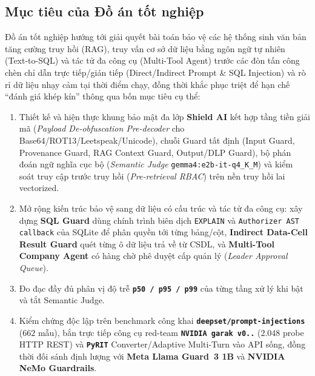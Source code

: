 \documentclass[a4paper,12pt]{article}
\begin{document}
\subsection{Mục tiêu của Đồ án tốt nghiệp}
Đồ án tốt nghiệp hướng tới giải quyết bài toán bảo vệ các hệ thống sinh văn bản tăng cường truy hồi (RAG), truy vấn cơ sở dữ liệu bằng ngôn ngữ tự nhiên (Text-to-SQL) và tác tử đa công cụ (Multi-Tool Agent) trước các đòn tấn công chèn chỉ dẫn trực tiếp/gián tiếp (Direct/Indirect Prompt \& SQL Injection) và rò rỉ dữ liệu nhạy cảm tại thời điểm chạy, đồng thời khắc phục triệt để hạn chế ``đánh giá khép kín'' thông qua bốn mục tiêu cụ thể:
\begin{enumerate}
    \item Thiết kế và hiện thực khung bảo mật đa lớp \textbf{Shield AI} kết hợp tầng tiền giải mã (\emph{Payload De-obfuscation Pre-decoder} cho Base64/ROT13/Leetspeak/Unicode), chuỗi Guard tất định (Input Guard, Provenance Guard, RAG Context Guard, Output/DLP Guard), bộ phán đoán ngữ nghĩa cục bộ (\emph{Semantic Judge} \texttt{gemma4:e2b-\allowbreak it-\allowbreak q4\_\allowbreak K\_\allowbreak M}) và kiểm soát truy cập trước truy hồi (\emph{Pre-retrieval RBAC}) trên nền truy hồi lai vectorized.
    \item Mở rộng kiến trúc bảo vệ sang dữ liệu có cấu trúc và tác tử đa công cụ: xây dựng \textbf{SQL Guard} dùng chính trình biên dịch \texttt{EXPLAIN} và \texttt{Authorizer AST callback} của SQLite để phân quyền tới từng bảng/cột, \textbf{Indirect Data-Cell Result Guard} quét từng ô dữ liệu trả về từ CSDL, và \textbf{Multi-Tool Company Agent} có hàng chờ phê duyệt cấp quản lý (\emph{Leader Approval Queue}).
    \item Đo đạc đầy đủ phân vị độ trễ \textbf{\texttt{p50 / p95 / p99}} của từng tầng xử lý khi bật và tắt Semantic Judge.
    \item Kiểm chứng độc lập trên benchmark công khai \textbf{\texttt{deepset/\allowbreak prompt-\allowbreak injections}} ($662$ mẫu), bắn trực tiếp công cụ red-team \textbf{\texttt{NVIDIA garak v0..}} ($2.048$ probe HTTP REST) và \textbf{\texttt{PyRIT}} Converter/Adaptive Multi-Turn vào API sống, đồng thời đối sánh định lượng với \textbf{Meta Llama Guard~3 1B} và \textbf{NVIDIA NeMo Guardrails}.
\end{enumerate}
\end{document}
